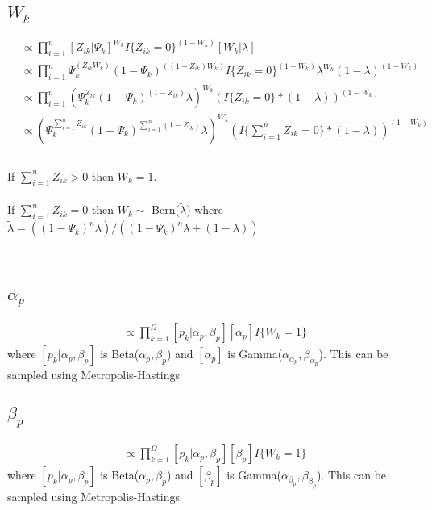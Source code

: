 \documentclass[fleqn]{article}
\begin{document}
\subsection{$W_k$}
%
\begin{align*}
  [W_k | \cdot] & \propto \prod_{i = 1}^n [Z_{ik} | \Psi_k]^{W_k} I\{Z_{ik} = 0\}^{(1 - W_k)} [W_k | \lambda]\\
  & \propto \prod_{i = 1}^n \Psi_k^{(Z_{ik} W_k)} (1 - \Psi_k)^{\left( (1 - Z_{ik}) W_k \right)} I\{Z_{ik} = 0\}^{(1 - W_k)} \lambda^{W_k} (1 - \lambda)^{(1 - W_k)}\\
  & \propto \prod_{i = 1}^n \left(\Psi_k^{Z_{ik}} (1 - \Psi_k)^{(1 - Z_{ik})} \lambda \right)^{W_k} \left( I\{Z_{ik} = 0\} * (1 - \lambda)\right)^{(1 - W_k)}\\
    & \propto \left(\Psi_k^{\sum_{i = 1}^n Z_{ik}} (1 - \Psi_k)^{\sum_{i = 1}^n (1 - Z_{ik})} \lambda \right)^{W_k} \left( I\{\sum_{i = 1}^n Z_{ik} = 0\} * (1 - \lambda)\right)^{(1 - W_k)}\\
\end{align*}
%
\\
If $\sum_{i = 1}^n Z_{ik} > 0$ then $W_k = 1$.\\
\\
If $\sum_{i = 1}^n Z_{ik} = 0$ then $W_k \sim$ Bern($\tilde{\lambda}$) where $\tilde{\lambda} = \left((1 - \Psi_k)^n \lambda \right) / \left((1 - \Psi_k)^n \lambda + (1 - \lambda) \right)$\\\\
\\

%
\subsection{$\alpha_p$}
%
\begin{align*}
  [\alpha_p | \cdot] & \propto \prod_{k = 1}^\Omega [p_k | \alpha_p, \beta_p] [\alpha_p] I\{W_k = 1\}
\end{align*}
where $[p_k | \alpha_p, \beta_p]$ is Beta($\alpha_p, \beta_p$) and $[\alpha_p]$ is Gamma($\alpha_{\alpha_p}, \beta_{\alpha_p}$). This can be sampled using Metropolis-Hastings
%
\subsection{$\beta_p$}
%
\begin{align*}
  [\beta_p | \cdot] & \propto \prod_{k = 1}^\Omega [p_k | \alpha_p, \beta_p] [\beta_p] I\{W_k = 1\}
\end{align*}
where $[p_k | \alpha_p, \beta_p]$ is Beta($\alpha_p, \beta_p$) and $[\beta_p]$ is Gamma($\alpha_{\beta_p}, \beta_{\beta_p}$). This can be sampled using Metropolis-Hastings
%
\end{document}
